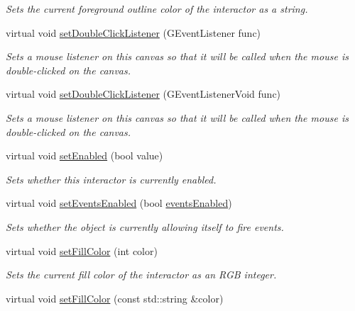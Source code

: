 \begin{DoxyCompactItemize}
\begin{DoxyCompactList}\small\item\em Sets the current foreground outline color of the interactor as a string. \end{DoxyCompactList}\item 
virtual void \mbox{\hyperlink{classGCanvas_ac29f9a3462458e165fae3a1f046ee77a}{set\+Double\+Click\+Listener}} (G\+Event\+Listener func)
\begin{DoxyCompactList}\small\item\em Sets a mouse listener on this canvas so that it will be called when the mouse is double-\/clicked on the canvas. \end{DoxyCompactList}\item 
virtual void \mbox{\hyperlink{classGCanvas_a50096194d66f48c92dd4c512d41bfc76}{set\+Double\+Click\+Listener}} (G\+Event\+Listener\+Void func)
\begin{DoxyCompactList}\small\item\em Sets a mouse listener on this canvas so that it will be called when the mouse is double-\/clicked on the canvas. \end{DoxyCompactList}\item 
virtual void \mbox{\hyperlink{classGInteractor_ab831367dd84bbd579e02e55bacb21343}{set\+Enabled}} (bool value)
\begin{DoxyCompactList}\small\item\em Sets whether this interactor is currently enabled. \end{DoxyCompactList}\item 
virtual void \mbox{\hyperlink{classGObservable_afaa30b2a9e0f378fd1c70d2f1d0b8216}{set\+Events\+Enabled}} (bool \mbox{\hyperlink{classGInteractor_ac05ba5b92e2e5146d416fe7f842a0969}{events\+Enabled}})
\begin{DoxyCompactList}\small\item\em Sets whether the object is currently allowing itself to fire events. \end{DoxyCompactList}\item 
virtual void \mbox{\hyperlink{classGDrawingSurface_a47fad447b715f2f303538434eed26709}{set\+Fill\+Color}} (int color)
\begin{DoxyCompactList}\small\item\em Sets the current fill color of the interactor as an R\+GB integer. \end{DoxyCompactList}\item 
virtual void \mbox{\hyperlink{classGDrawingSurface_adbc18b1a930aadd97d7437f9f7265b96}{set\+Fill\+Color}} (const std\+::string \&color)

\end{DoxyCompactItemize}
